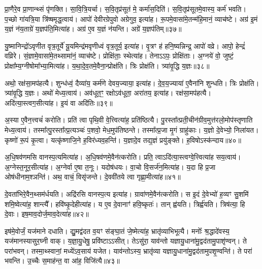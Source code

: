 प्रा॒णैरे॒व प्रा॒णान्थ्सं पृ॑णक्ति।
सा॒वि॒त्रि॒यर्चा।
स॒वि॒तृप्र॑सूतं मे॒ कर्मा॑स॒दिति॑।
स॒वि॒तृप्र॑सूतमे॒वास्य॒ कर्म॑ भवति।
प॒च्छो गा॑यत्रि॒या त्रि॑ष्षमृद्ध॒त्वाय॑।
आपो॑ देवीरग्रेपुवो अग्रेगुव॒ इत्या॑ह।
रू॒पमे॒वासा॑मे॒तन्म॑हि॒मानं॒ व्याच॑ष्टे।
अग्र॑ इ॒मं य॒ज्ञं न॑य॒ताग्रे॑ य॒ज्ञप॑ति॒मित्या॑ह।
अग्र॑ ए॒व य॒ज्ञं न॑यन्ति।
अग्रे॑ य॒ज्ञप॑तिम्॥३७॥

यु॒ष्मानिन्द्रो॑\-ऽवृणीत वृत्र॒तूर्ये॑ यू॒यमिन्द्र॑मवृणीध्वं वृत्र॒तूर्य॒ इत्या॑ह।
वृ॒त्रꣳ ह॑ हनि॒ष्यन्निन्द्र॒ आपो॑ वव्रे।
आपो॒ हेन्द्रं॑ वव्रिरे।
सं॒ज्ञामे॒वासा॑मे॒तथ्सामा॑नं॒ व्याच॑ष्टे।
प्रोक्षि॑ताः॒ स्थेत्या॑ह।
तेनाऽऽपः॒ प्रोक्षि॑ताः।
अ॒ग्नये॑ वो॒ जुष्टं॒ प्रोक्षा᳚म्य॒ग्नीषोमा᳚भ्या॒मित्या॑ह।
य॒था॒दे॒व॒तमे॒वैना॒न्प्रोक्ष॑ति।
त्रिः प्रोक्ष॑ति।
त्र्या॑वृ॒द्धि य॒ज्ञः॥३८॥

अथो॒ रक्ष॑सा॒मप॑हत्यै।
शुन्ध॑ध्वं॒ दैव्या॑य॒ कर्म॑णे देवय॒ज्याया॒ इत्या॑ह।
दे॒व॒य॒ज्याया॑ ए॒वैना॑नि शुन्धति।
त्रिः प्रोक्ष॑ति।
त्र्या॑वृ॒द्धि य॒ज्ञः।
अथो॑ मेध्य॒त्वाय॑।
अव॑धूत॒ꣳ॒ रक्षो\-ऽव॑धूता॒ अरा॑तय॒ इत्या॑ह।
रक्ष॑सा॒मप॑हत्यै।
अदि॑त्या॒स्त्वग॒सीत्या॑ह।
इ॒यं वा अदि॑तिः॥३९॥

अ॒स्या ए॒वैन॒त्त्वचं॑ करोति।
प्रति॑ त्वा पृथि॒वी वे॒त्त्वित्या॑ह॒ प्रति॑\-ष्ठित्यै।
पु॒रस्ता᳚त्प्रती॒चीन॑ग्रीव॒मुत्त॑रलो॒मोप॑स्तृणाति मेध्य॒त्वाय॑।
तस्मा᳚त्पु॒रस्ता᳚त्प्र॒त्यञ्चः॑ प॒शवो॒ मेध॒मुप॑तिष्ठन्ते।
तस्मा᳚त्प्र॒जा मृ॒गं ग्राहु॑काः।
य॒ज्ञो दे॒वेभ्यो॒ निला॑यत।
कृष्णो॑ रू॒पं कृ॒त्वा।
यत्कृ॑ष्णाजि॒ने ह॒विर॑ध्यव॒हन्ति॑।
य॒ज्ञादे॒व तद्य॒ज्ञं प्रयु॑ङ्क्ते।
ह॒विषो\-ऽस्क॑न्दाय॥४०॥

अ॒धि॒षव॑णमसि वानस्प॒त्यमित्या॑ह।
अ॒धि॒षव॑ण\-मे॒वैन॑त्करोति।
प्रति॒ त्वा\-ऽदि॑त्या॒स्त्वग्वे॒त्त्वित्या॑ह सय॒त्वाय॑।
अ॒ग्नेस्त॒नूर॒सी\-त्या॑ह।
अ॒ग्नेर्वा ए॒षा त॒नूः।
यदोष॑धयः।
वा॒चो वि॒सर्ज॑न॒मित्या॑ह।
य॒दा हि प्र॒जा ओष॑धीनाम॒श्ञन्ति॑।
अथ॒ वाचं॒ विसृ॑जन्ते।
दे॒ववी॑तये त्वा गृह्णा॒मीत्या॑ह॥४१॥

दे॒वता॑भिरे॒वैन॒थ्सम॑र्धयति।
अद्रि॑रसि वानस्प॒त्य इत्या॑ह।
ग्रावा॑णमे॒वैन॑त्करोति।
स इ॒दं दे॒वेभ्यो॑ ह॒व्यꣳ सु॒शमि॑ शमि॒ष्वेत्या॑ह॒ शान्त्यै᳚।
हवि॑ष्कृ॒देहीत्या॑ह।
य ए॒व दे॒वानाꣳ॑ हवि॒ष्कृतः॑।
तान्‌ ह्व॑यति।
त्रिर्ह्व॑यति।
त्रिष॑त्या॒ हि दे॒वाः।
इष॒माव॒दोर्ज॒माव॒देत्या॑ह॥४२॥

इष॑मे॒वोर्जं॒ यज॑माने दधाति।
द्यु॒मद्व॑दत व॒यꣳ स॑ङ्घा॒तं जे॒ष्मेत्या॑ह॒ भ्रातृ॑व्याभिभूत्यै।
मनोः᳚ श्र॒द्धादे॑वस्य॒ यज॑मानस्या\-सुर॒घ्नी वाक्।
य॒ज्ञा॒यु॒धेषु॒ प्रवि॑ष्टा\-ऽऽसीत्।
तेऽसु॑रा॒ याव॑न्तो यज्ञायु॒धाना॑मु॒द्वद॑ता\-मु॒पा\-शृ॑ण्वन्।
ते परा॑भवन्।
तस्मा॒थ्स्वानां॒ मध्ये॑\-ऽव॒साय॑ यजेत।
याव॑न्तो\-ऽस्य॒ भ्रातृ॑व्या यज्ञायु॒धाना॑\-मु॒द्वद॑ता\-मुप\-शृ॒ण्वन्ति॑।
ते परा॑ भवन्ति।
उ॒च्चैः स॒माह॑न्त॒ वा आ॑ह॒ विजि॑त्यै॥४३॥

